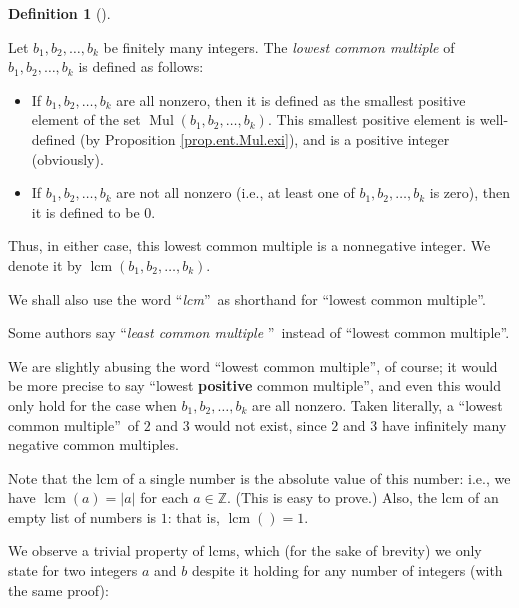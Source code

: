 \documentclass[numbers=enddot,12pt,final,onecolumn,notitlepage]{scrartcl}%
\numberwithin{exer}{subsection}
\theoremstyle{definition}
\newtheorem{defi}[theo]{Definition}
\newenvironment{definition}[1][]
{\begin{defi}[#1]\begin{leftbar}}
{\end{leftbar}\end{defi}}
\begin{document}
\begin{definition}
\label{def.ent.lcm.lcm}Let $b_{1},b_{2},\ldots,b_{k}$ be finitely many
integers. The \textit{lowest common multiple} of $b_{1},b_{2},\ldots,b_{k}$ is
defined as follows:

\begin{itemize}
\item If $b_{1},b_{2},\ldots,b_{k}$ are all nonzero, then it is defined as the
smallest positive element of the set $\operatorname*{Mul}\left(  b_{1}%
,b_{2},\ldots,b_{k}\right)  $. This smallest positive element is well-defined
(by Proposition \ref{prop.ent.Mul.exi}), and is a positive integer (obviously).

\item If $b_{1},b_{2},\ldots,b_{k}$ are not all nonzero (i.e., at least one of
$b_{1},b_{2},\ldots,b_{k}$ is zero), then it is defined to be $0$.
\end{itemize}

Thus, in either case, this lowest common multiple is a nonnegative integer. We
denote it by $\operatorname{lcm}\left(  b_{1},b_{2},\ldots,b_{k}\right)  $.

We shall also use the word \textquotedblleft\textit{lcm}\textquotedblright\ as
shorthand for \textquotedblleft lowest common multiple\textquotedblright.
\end{definition}

Some authors say \textquotedblleft\textit{least common multiple}%
\textquotedblright\ instead of \textquotedblleft lowest common
multiple\textquotedblright.

We are slightly abusing the word \textquotedblleft lowest common
multiple\textquotedblright, of course; it would be more precise to say
\textquotedblleft lowest \textbf{positive} common multiple\textquotedblright,
and even this would only hold for the case when $b_{1},b_{2},\ldots,b_{k}$ are
all nonzero. Taken literally, a \textquotedblleft lowest common
multiple\textquotedblright\ of $2$ and $3$ would not exist, since $2$ and $3$
have infinitely many negative common multiples.

Note that the lcm of a single number is the absolute value of this number:
i.e., we have $\operatorname{lcm}\left(  a\right)  =\left\vert a\right\vert $
for each $a\in\mathbb{Z}$. (This is easy to prove.) Also, the lcm of an empty
list of numbers is $1$: that is, $\operatorname{lcm}\left(  {}\right)  =1$.

We observe a trivial property of lcms, which (for the sake of brevity) we only
state for two integers $a$ and $b$ despite it holding for any number of
integers (with the same proof):
\end{document}
